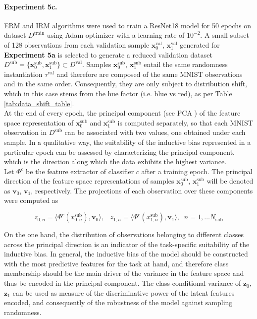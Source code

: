 \paragraph{Experiment 5c.}
    ERM and IRM \cite{arjovskyInvariantRiskMinimization2020} algorithms were used to train a ResNet18 model 
    for 50 epochs on dataset $D^{\text{train}}$ using Adam \cite{kingmaAdamMethodStochastic2017}
    optimizer with a learning rate of $10^{-2}$. A small subset of 128 observations from each 
    validation sample $\bm{x}_0^{\text{val}}$, $\bm{x}_1^{\text{val}}$
    generated for \textbf{Experiment 5a} is selected to generate a reduced validation dataset 
    $D^{\text{sub}} = \{ \bm{x}_0^{\text{sub}}, \bm{x}_1^{\text{sub}}\} \subset D^{\text{val}}$. Samples $\bm{x}_0^{\text{sub}}$, 
    $\bm{x}_1^{\text{sub}}$ entail the same randomness instantiation $\tau^{\text{val}}$ and therefore 
    are composed of the same MNIST observations and in the same order. Consequently, they are only
    subject to distribution shift, which in this case stems from the hue factor (i.e. blue vs red), 
    as per Table \ref{tab:data_shift_table}. \\

    At the end of every epoch, the principal component (see PCA \cite{jolliffe2002principal}) of the feature 
    space representation of $\bm{x}_0^{\text{sub}}$ and $\bm{x}_1^{\text{sub}}$ is computed separately, 
    so that each MNIST observation in $D^{\text{sub}}$ can be associated with two values, one obtained under each sample.
    In a qualitative way, the suitability of the inductive bias represented in a particular 
    epoch can be assessed by characterizing the principal component, which is the direction along 
    which the data exhibits the highest variance. \\

    Let $\Phi^c$ be the feature extractor of classifier $c$ after a training epoch. The principal
    direction of the feature space representations of samples $\bm{x}_0^{\text{sub}}$, $\bm{x}_1^{\text{sub}}$
    will be denoted as $\bm{v}_0$, $\bm{v}_1$, respectively. The projections of each observation over these
    components were computed as

    $$
    z_{0, n} = \langle \Phi^c(x_{0, n}^{\text{sub}}), \bm{v}_0 \rangle, \;\;\; z_{1, n} = \langle \Phi^c(x_{1, n}^{\text{sub}}), \bm{v}_1 \rangle , \;\; n = 1, \dots N_{\text{sub}}
    $$

    On the one hand, the distribution of observations belonging to different classes across the principal
    direction is an indicator of the task-specific suitability of the inductive bias. In general, the
    inductive bias of the model should be constructed with the most predictive features for the task at hand, 
    and therefore class membership should be the main driver of the variance in the feature space and thus 
    be encoded in the principal component. The class-conditional variance of $\bm{z}_0$, $\bm{z}_1$
    can be used as measure of the discriminative power of the latent features encoded, and consequently of the 
    robustness of the model against sampling randomness. \\
    
